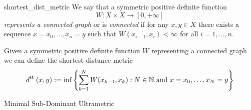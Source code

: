 \begin{definition}{}{shortest_dist_metric}
We say that a symmetric positive definite function
$$
W: X \times X \to [0, +\infty]
$$
\emph{represents a connected graph} or is \emph{connected} if for any $x,y \in X$ there exists a sequence $x = x_0, \dots, x_n = y$ such that $W(x_{i-1}, x_{i}) < \infty$ for all $i = 1, \dots, n$.
\end{definition}

\begin{definition}{}{}
Given a symmetric positive definite function $W$ representing a connected graph we can define the shortest distance metric
\begin{equation*}
    d^W(x,y) := \inf\left\{ \sum_{k = 1}^N W(x_{k-1}, x_k): N \in \mathbb N \text{ and } x = x_0, \dots, x_N = y\right\}
\end{equation*}
\end{definition}



\begin{defprop}{}{}

Minimal Sub-Dominant Ultrametric
\end{defprop}
